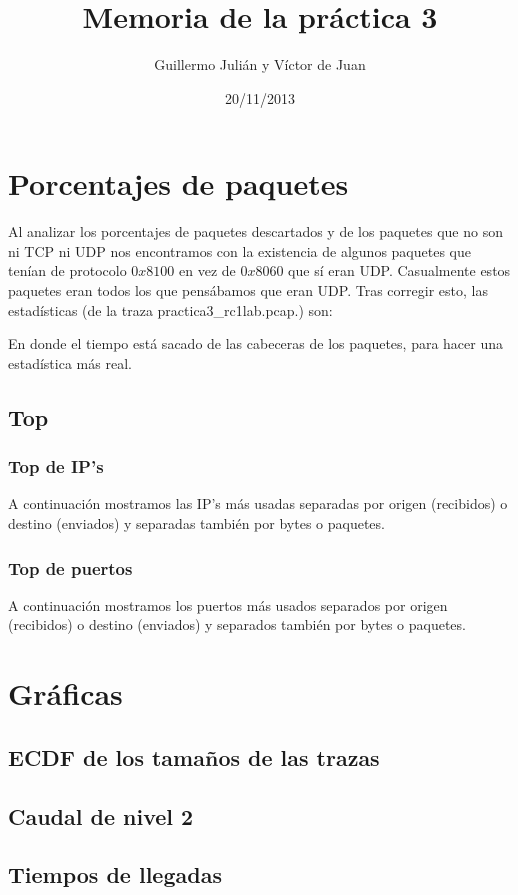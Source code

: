 \documentclass{apuntes}
\title{Memoria de la práctica 3}
\author{Guillermo Julián y Víctor de Juan}
\date{20/11/2013}
\begin{document}
\pagestyle{plain}
\maketitle
\tableofcontents

\chapter{Porcentajes de paquetes}


Al analizar los porcentajes de paquetes descartados y de los paquetes que no son ni TCP ni UDP nos encontramos con la existencia de algunos paquetes que tenían de protocolo $0x8100$ en vez de $0x8060$ que sí eran UDP. Casualmente estos paquetes eran todos los que pensábamos que eran UDP. Tras corregir esto, las estadísticas (de la traza practica3\_rc1lab.pcap.) son:


En donde el tiempo está sacado de las cabeceras de los paquetes, para hacer una estadística más real.

\newpage
\section{Top}

\subsection{Top de IP's}

A continuación mostramos las IP's más usadas separadas por origen (recibidos) o destino (enviados) y separadas también por bytes o paquetes.

\newpage
\subsection{Top de puertos}

A continuación mostramos los puertos más usados separados por origen (recibidos) o destino (enviados) y separados también por bytes o paquetes.


\chapter{Gr\'aficas}

\section{ECDF de los tamaños de las trazas}

\section{Caudal de nivel 2}

\section{Tiempos de llegadas}
\end{document}
